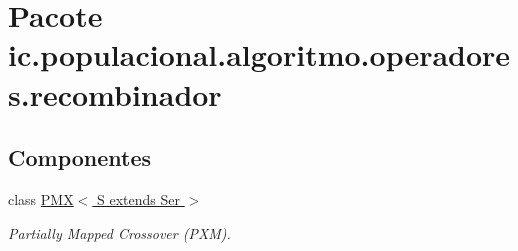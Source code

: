 \hypertarget{namespaceic_1_1populacional_1_1algoritmo_1_1operadores_1_1recombinador}{\section{Pacote ic.\-populacional.\-algoritmo.\-operadores.\-recombinador}
\label{namespaceic_1_1populacional_1_1algoritmo_1_1operadores_1_1recombinador}
}
\subsection*{Componentes}
\begin{DoxyCompactItemize}
\item 
class \hyperlink{classic_1_1populacional_1_1algoritmo_1_1operadores_1_1recombinador_1_1_p_m_x_3_01_s_01extends_01_ser_01_4}{P\-M\-X$<$ S extends Ser $>$}
\begin{DoxyCompactList}\small\item\em Partially Mapped Crossover (P\-X\-M). \end{DoxyCompactList}\end{DoxyCompactItemize}
